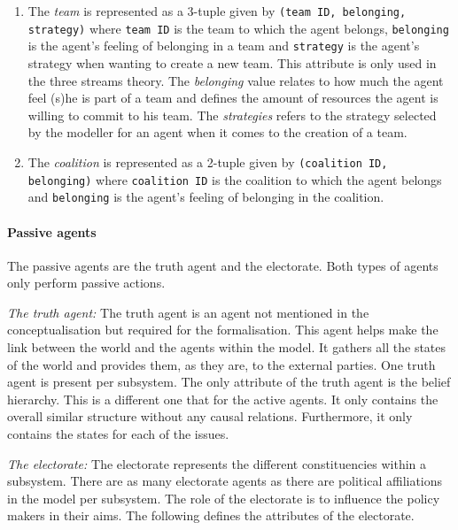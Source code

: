 \begin{enumerate}
\item The \emph{team} is represented as a 3-tuple given by \texttt{(team ID, belonging, strategy)} where \texttt{team ID} is the team to which the agent belongs, \texttt{belonging} is the agent’s feeling of belonging in a team and \texttt{strategy} is the agent's strategy when wanting to create a new team.  This attribute is only used in the three streams theory. The \emph{belonging} value relates to how much the agent feel (s)he is part of a team and defines the amount of resources the agent is willing to commit to his team. The \emph{strategies} refers to the strategy selected by the modeller for an agent when it comes to the creation of a team.

\item The \emph{coalition} is represented as a 2-tuple given by \texttt{(coalition ID, belonging)} where \texttt{coalition ID} is the coalition to which the agent belongs and \texttt{belonging} is the agent’s feeling of belonging in the coalition.

\end{enumerate}

\paragraph{Passive agents}

The passive agents are the truth agent and the electorate. Both types of agents only perform passive actions.

\emph{The truth agent: } The truth agent is an agent not mentioned in the conceptualisation but required for the formalisation. This agent helps make the link between the world and the agents within the model. It gathers all the states of the world and provides them, as they are, to the external parties. One truth agent is present per subsystem. The only attribute of the truth agent is the belief hierarchy. This is a different one that for the active agents. It only contains the overall similar structure without any causal relations. Furthermore, it only contains the states for each of the issues.

\emph{The electorate: } The electorate represents the different constituencies within a subsystem. There are as many electorate agents as there are political affiliations in the model per subsystem. The role of the electorate is to influence the policy makers in their aims. The following defines the attributes of the electorate.

